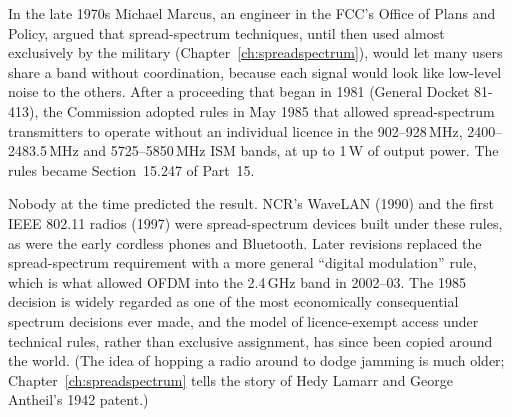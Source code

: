 
\begin{history}
In the late 1970s Michael Marcus, an engineer in the FCC's Office of Plans and Policy, argued that
spread-spectrum techniques, until then used almost exclusively by the military
(Chapter~\ref{ch:spreadspectrum}), would let many users share a band without coordination,
because each signal would look like low-level noise to the others. After a proceeding that began
in 1981 (General Docket 81-413), the Commission adopted rules in May 1985 that allowed
spread-spectrum transmitters to operate without an individual licence in the 902--928\,MHz,
2400--2483.5\,MHz and 5725--5850\,MHz ISM bands, at up to 1\,W of output power. The rules became
Section~15.247 of Part~15.

Nobody at the time predicted the result. NCR's WaveLAN (1990) and the first IEEE 802.11 radios
(1997) were spread-spectrum devices built under these rules, as were the early cordless phones and
Bluetooth. Later revisions replaced the spread-spectrum requirement with a more general ``digital
modulation'' rule, which is what allowed OFDM into the 2.4\,GHz band in 2002--03. The 1985
decision is widely regarded as one of the most economically consequential spectrum decisions ever
made, and the model of licence-exempt access under technical rules, rather than exclusive
assignment, has since been copied around the world. (The idea of hopping a radio around to dodge
jamming is much older; Chapter~\ref{ch:spreadspectrum} tells the story of Hedy Lamarr and George
Antheil's 1942 patent.)
\end{history}


